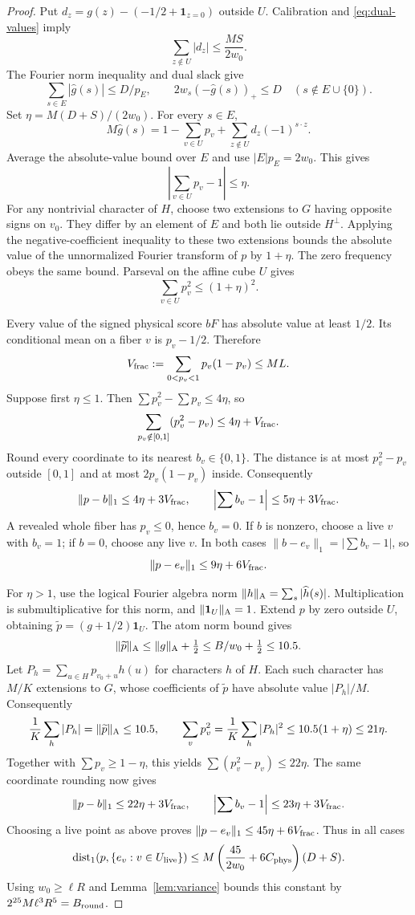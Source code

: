 \documentclass[11pt]{article}
\theoremstyle{remark}\newtheorem{remark}[theorem]{Remark}
\newcommand{\one}{\mathbf1}\newcommand{\F}{\mathbb F}
\begin{document}
\begin{proof}
Put $d_z=g(z)-(-1/2+\one_{z=0})$ outside $U$. Calibration and
\eqref{eq:dual-values} imply
\[
 \sum_{z\notin U}|d_z|\le\frac{MS}{2w_0}.
\]
The Fourier norm inequality and dual slack give
\[
 \sum_{s\in E}|\widehat g(s)|\le D/p_E,
 \qquad 2w_s(-\widehat g(s))_+\le D\quad(s\notin E\cup\{0\}).
\]
Set $\eta=M(D+S)/(2w_0)$. For every $s\in E$,
\[
 M\widehat g(s)=1-\sum_{v\in U}p_v
                  +\sum_{z\notin U}d_z(-1)^{s\cdot z}.
\]
Average the absolute-value bound over $E$ and use
$|E|p_E=2w_0$. This gives
\[
 \left|\sum_{v\in U}p_v-1\right|\le\eta.
\]
For any nontrivial character of $H$, choose two extensions to $G$ having
opposite signs on $v_0$. They differ by an element of $E$ and both lie
outside $H^\perp$. Applying the negative-coefficient inequality to these
two extensions bounds the absolute value of the unnormalized Fourier
transform of $p$ by $1+\eta$. The zero frequency obeys the same bound.
Parseval on the affine cube $U$ gives
\begin{equation}\label{eq:p-l2}
 \sum_{v\in U}p_v^2\le(1+\eta)^2.
\end{equation}

Every value of the signed physical score $bF$ has absolute value at least
$1/2$. Its conditional mean on a fiber $v$ is $p_v-1/2$. Therefore
\[
 V_{\rm frac}:=\sum_{0<p_v<1}p_v(1-p_v)\le ML.
\]
Suppose first $\eta\le1$. Then
$\sum p_v^2-\sum p_v\le4\eta$, so
\[
 \sum_{p_v\notin[0,1]}(p_v^2-p_v)\le4\eta+V_{\rm frac}.
\]
Round every coordinate to its nearest $b_v\in\{0,1\}$. The distance is
at most $p_v^2-p_v$ outside $[0,1]$ and at most $2p_v(1-p_v)$ inside.
Consequently
\[
 \|p-b\|_1\le4\eta+3V_{\rm frac},\qquad
 \left|\sum b_v-1\right|\le5\eta+3V_{\rm frac}.
\]
A revealed whole fiber has $p_v\le0$, hence $b_v=0$. If $b$ is nonzero,
choose a live $v$ with $b_v=1$; if $b=0$, choose any live $v$. In both
cases $\|b-e_v\|_1=|\sum b_v-1|$, so
\[
 \|p-e_v\|_1\le9\eta+6V_{\rm frac}.
\]

For $\eta>1$, use the logical Fourier algebra norm
$\|h\|_{\rm A}=\sum_s|\widehat h(s)|$. Multiplication is submultiplicative
for this norm, and $\|\one_U\|_{\rm A}=1$. Extend $p$ by zero outside
$U$, obtaining $\widetilde p=(g+1/2)\one_U$. The atom norm bound gives
\[
 \|\widetilde p\|_{\rm A}
 \le\|g\|_{\rm A}+\tfrac12
 \le B/w_0+\tfrac12\le10.5.
\]
Let $P_h=\sum_{u\in H}p_{v_0+u}h(u)$ for characters $h$ of $H$.
Each such character has $M/K$ extensions to $G$, whose coefficients of
$\widetilde p$ have absolute value $|P_h|/M$. Consequently
\[
 \frac1K\sum_h|P_h|=\|\widetilde p\|_{\rm A}\le10.5,
 \qquad
 \sum_vp_v^2=\frac1K\sum_h|P_h|^2
 \le10.5(1+\eta)\le21\eta.
\]
Together with $\sum p_v\ge1-\eta$, this yields
$\sum(p_v^2-p_v)\le22\eta$. The same coordinate rounding now gives
\[
 \|p-b\|_1\le22\eta+3V_{\rm frac},\qquad
 \left|\sum b_v-1\right|\le23\eta+3V_{\rm frac}.
\]
Choosing a live point as above proves
$\|p-e_v\|_1\le45\eta+6V_{\rm frac}$. Thus in all cases
\[
 \operatorname{dist}_1(p,\{e_v:v\in U_{\rm live}\})
 \le M\left(\frac{45}{2w_0}+6C_{\rm phys}\right)(D+S).
\]
Using $w_0\ge\ell R$ and Lemma~\ref{lem:variance} bounds this constant by
$2^{25}M\ell^3R^5=B_{\rm round}$.
\end{proof}
\end{document}
